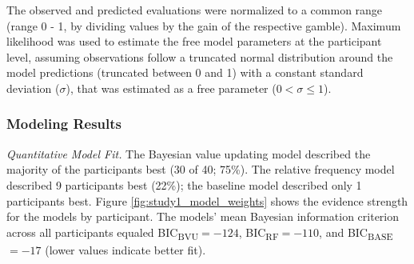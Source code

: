 \documentclass[a4paper, man, floatsintext]{apa6}
\begin{document}
The observed and predicted evaluations were normalized to a common range
(range 0 - 1, by dividing values by the gain of the respective gamble).
Maximum likelihood was used to estimate the free model parameters at the
participant level, assuming observations follow a truncated normal
distribution around the model predictions (truncated between 0 and 1)
with a constant standard deviation (\(\sigma\)), that was estimated as a
free parameter (\(0 < \sigma \leq 1\)).

\subsubsection{Modeling Results}

\textit{Quantitative Model Fit.} The Bayesian value updating model
described the majority of the participants best (30 of 40; 75\%). The
relative frequency model described 9 participants best (22\%); the
baseline model described only 1 participants best. Figure
\ref{fig:study1_model_weights} shows the evidence strength for the
models by participant. The models' mean Bayesian information criterion
across all participants equaled BIC\textsubscript{BVU}\(= -124\),
BIC\textsubscript{RF}\(= -110\), and BIC\textsubscript{BASE}\(= -17\)
(lower values indicate better fit).
\end{document}
